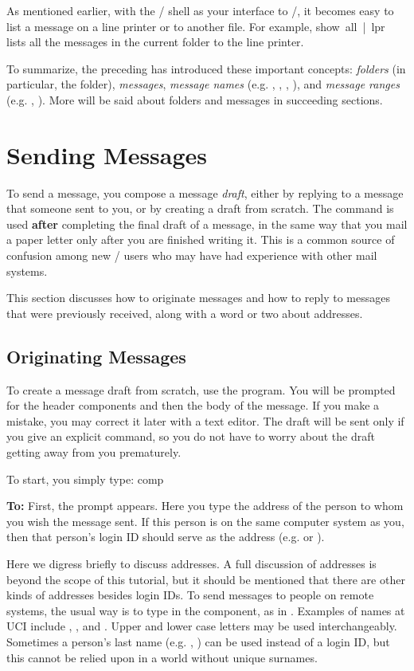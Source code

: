 As mentioned earlier,
with the \unix/ shell as your interface to \MH/,
it becomes easy to list a message on a line printer or to another file.
For example,
\example show\ all\ |\ lpr\endexample
lists all the messages in the current folder to the line printer.

To summarize, the preceding has introduced these important concepts:
{\it folders} (in particular, the  folder),
{\it messages},
{\it message names} (e.g. , , , ),
and {\it message ranges} (e.g. , ).
More will be said about folders and messages in succeeding sections.

\section{Sending Messages}
To send a message, you compose a message {\it draft},
either by replying to a message that someone sent to you,
or by creating a draft from scratch.
The  command is used {\bf after} completing the final draft
of a message, 
in the same way that you mail a paper letter only after you are finished
writing it.
This is a common source of confusion among new \MH/ users who
may have had experience with other mail systems.

This section discusses how to originate messages
and how to reply to messages that were previously received,
along with a word or two about addresses.

\subsection{Originating Messages}
To create a message draft from scratch,
use the  program.
You will be prompted for the header components
and then the body of the message.
If you make a mistake, you may correct it later with a text editor.
The draft will be sent only if you give an explicit  command,
so you do not have to worry about the draft getting away from you
prematurely.

To start, you simply type:
\example comp\endexample

{\bf To:}
First, the prompt  appears.
Here you type the address of the person to whom you wish the message sent.
If this person is on the same computer system as you,
then that person's login ID should serve as the address
(e.g.  or ).

Here we digress briefly to discuss addresses.
A full discussion of addresses is beyond the scope of this
tutorial, but it should be mentioned that there are other
kinds of addresses besides login IDs.
To send messages to people on remote systems, 
the usual way is to type  in the  component,
as in .
Examples of  names at UCI include
,
,
and .
Upper and lower case letters may be used interchangeably.
Sometimes a person's last name (e.g. , ) can be used
instead of a login ID,
but this cannot be relied upon in a world without unique surnames.

